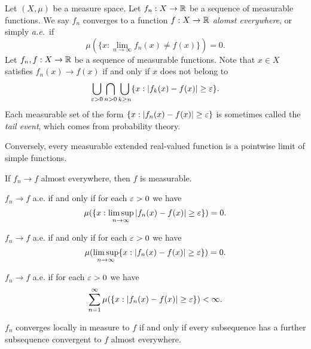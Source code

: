 \documentclass{../../large}
\begin{document}
\begin{prb}
Let $(X,\mu)$ be a measure space.
Let $f_n:X\to\mathbb{R}$ be a sequence of measurable functions.
We say $f_n$ converges to a function $f:X\to\mathbb{R}$ \emph{alomst everywhere}, or simply \emph{a.e.}~if
\[\mu(\{x:\lim_{n\to\infty}f_n(x)\ne f(x)\})=0.\]
Let $f_n,f:X\to\mathbb{R}$ be a sequence of measurable functions.
Note that $x\in X$ satisfies $f_n(x)\to f(x)$ if and only if $x$ does not belong to
\[\bigcup_{\varepsilon>0}\bigcap_{n>0}\bigcup_{k\ge n}\{x:|f_k(x)-f(x)|\ge\varepsilon\}.\]
Each measurable set of the form $\{x:|f_n(x)-f(x)|\ge\varepsilon\}$ is sometimes called the \emph{tail event}, which comes from probability theory.



Conversely, every measurable extended real-valued function is a pointwise limit of simple functions.

\begin{parts}
\item If $f_n\to f$ almost everywhere, then $f$ is measurable.
\item $f_n\to f$ a.e. if and only if for each $\varepsilon>0$ we have
\[\mu(\{x:\limsup_{n\to\infty}|f_n(x)-f(x)|\ge\varepsilon\})=0.\]
\item $f_n\to f$ a.e. if and only if for each $\varepsilon>0$ we have
\[\mu(\limsup_{n\to\infty}\{x:|f_n(x)-f(x)|\ge\varepsilon\})=0.\]
\item $f_n\to f$ a.e. if for each $\varepsilon>0$ we have
\[\sum_{n=1}^\infty\mu(\{x:|f_n(x)-f(x)|\ge\varepsilon\})<\infty.\]

\item $f_n$ converges locally in measure to $f$ if and only if every subsequence has a further subsequence convergent to $f$ almost everywhere.
\end{parts}
\end{prb}
\end{document}
